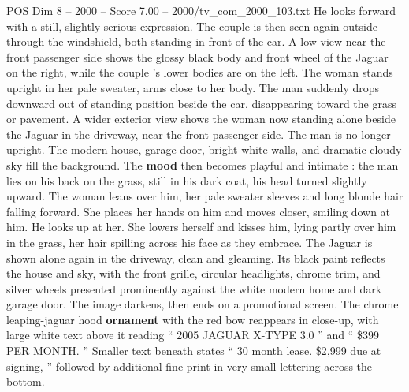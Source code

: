 \begin{textsample}{POS Dim 8 – 2000 – Score 7.00 – 2000/tv\_com\_2000\_103.txt}
He looks forward with a still, slightly serious expression.
The couple is then seen again outside through the windshield, both standing in front of the car.
A low view near the front passenger side shows the glossy black body and front wheel of the Jaguar on the right, while the couple ’s lower bodies are on the left.
The woman stands upright in her pale sweater, arms close to her body.
The man suddenly drops downward out of standing position beside the car, disappearing toward the grass or pavement.
A wider exterior view shows the woman now standing alone beside the Jaguar in the driveway, near the front passenger side.
The man is no longer upright.
The modern house, garage door, bright white walls, and dramatic cloudy sky fill the background.
The \textbf{mood} then becomes playful and intimate : the man lies on his back on the grass, still in his dark coat, his head turned slightly upward.
The woman leans over him, her pale sweater sleeves and long blonde hair falling forward.
She places her hands on him and moves closer, smiling down at him.
He looks up at her.
She lowers herself and kisses him, lying partly over him in the grass, her hair spilling across his face as they embrace.
The Jaguar is shown alone again in the driveway, clean and gleaming.
Its black paint reflects the house and sky, with the front grille, circular headlights, chrome trim, and silver wheels presented prominently against the white modern home and dark garage door.
The image darkens, then ends on a promotional screen.
The chrome leaping-jaguar hood \textbf{ornament} with the red bow reappears in close-up, with large white text above it reading “ 2005 JAGUAR X-TYPE 3.0 ” and “ \$399 PER MONTH. ” Smaller text beneath states “ 30 month lease. \$2,999 due at signing, ” followed by additional fine print in very small lettering across the bottom.

\end{textsample}

